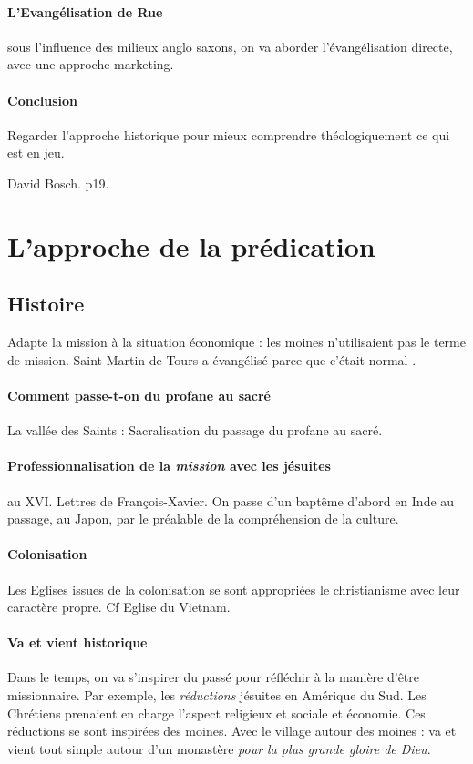 \paragraph{L'Evangélisation de Rue} sous l'influence des milieux anglo saxons, on va aborder l'évangélisation directe, avec une approche marketing.

\paragraph{Conclusion} Regarder l'approche historique pour mieux comprendre théologiquement ce qui est en jeu.

David Bosch. p19. 

\section{L'approche de la prédication}

\subsection{Histoire}
Adapte la mission à la situation économique : les moines n'utilisaient pas le terme de mission. Saint Martin de Tours a évangélisé parce que c'était normal .


\paragraph{Comment passe-t-on du profane au sacré} {La vallée des Saints : Sacralisation} du passage du profane au sacré. 

\paragraph{Professionnalisation de la \textit{mission} avec les jésuites}  au XVI. 
Lettres de François-Xavier. On passe d'un baptême d'abord en Inde au passage, au Japon, par le préalable de la compréhension de la culture.

\paragraph{Colonisation} Les Eglises issues de la colonisation se sont appropriées le christianisme avec leur caractère propre. Cf Eglise du Vietnam.


\paragraph{Va et vient historique}
Dans le temps, on va s'inspirer du passé pour réfléchir à la manière d'être missionnaire. Par exemple, les \textit{réductions} jésuites en Amérique du Sud. Les Chrétiens prenaient en charge l'aspect religieux et sociale et économie. Ces réductions se sont inspirées des moines. Avec le village autour des moines : va et vient tout simple autour d'un monastère \textit{pour la plus grande gloire de Dieu}.

